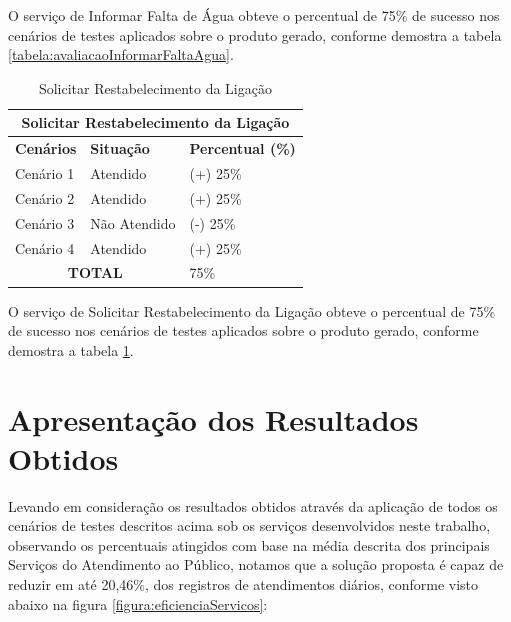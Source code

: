 O serviço de Informar Falta de Água obteve o percentual de 75\% de sucesso nos cenários de testes aplicados sobre o produto gerado, conforme demostra a tabela \ref{tabela:avaliacaoInformarFaltaAgua}.


\begin{table}[H]
	\center
	\footnotesize
	\caption{Solicitar Restabelecimento da Ligação}
	\label{tabela:avaliacaoRestabelerLigacaoAgua}
	\begin{tabular}{|p{3cm}|p{3cm}|p{3cm}|}
		\hline
		\multicolumn{3}{|c|}{\textbf{Solicitar Restabelecimento da Ligação}} \\
		\hline
		\textbf{Cenários}  	& \textbf{Situação} & \textbf{Percentual (\%)}  \\
		\hline		
		Cenário 1			& Atendido 		& (+) 25\% 	\\
		\hline
		Cenário 2 			& Atendido		& (+) 25\% 	\\
		\hline
		Cenário 3 			& Não Atendido 	& (-) 25\%	\\
		\hline
		Cenário 4			& Atendido		& (+) 25\% 	\\
		\hline		
		\multicolumn{2}{|c|}{\textbf{TOTAL}}	& 75\% 	\\
		\hline				
	\end{tabular}
\end{table}

O serviço de Solicitar Restabelecimento da Ligação obteve o percentual de 75\% de sucesso nos cenários de testes aplicados sobre o produto gerado, conforme demostra a tabela \ref{tabela:avaliacaoRestabelerLigacaoAgua}.



\section{Apresentação dos Resultados Obtidos}

Levando em consideração os resultados obtidos através da aplicação de todos os cenários de testes descritos acima sob os serviços desenvolvidos neste trabalho, observando os percentuais atingidos com base na média descrita dos principais Serviços do Atendimento ao Público, notamos que a solução proposta é capaz de reduzir em até 20,46\%, dos registros de atendimentos diários, conforme visto abaixo na figura \ref{figura:eficienciaServicos}:	


